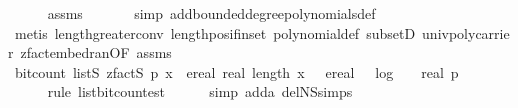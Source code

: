 \begin{isabellebody}
\ \ \ \ \isamarkupfalse%
\ assms{\isacharparenleft}{\kern0pt}{}{\isacharparenright}{\kern0pt}\ \isanewline
\ \ \ \ \isamarkupfalse%
\ {\isacharparenleft}{\kern0pt}simp\ add{\isacharcolon}{\kern0pt}bounded{\isacharunderscore}{\kern0pt}degree{\isacharunderscore}{\kern0pt}polynomials{\isacharunderscore}{\kern0pt}def{\isacharparenright}{\kern0pt}\isanewline
\ \ \ \ \isamarkupfalse%
\ {\isacharparenleft}{\kern0pt}metis\ length{\isacharunderscore}{\kern0pt}greater{\isacharunderscore}{\kern0pt}{}{\isacharunderscore}{\kern0pt}conv\ length{\isacharunderscore}{\kern0pt}pos{\isacharunderscore}{\kern0pt}if{\isacharunderscore}{\kern0pt}in{\isacharunderscore}{\kern0pt}set\ polynomial{\isacharunderscore}{\kern0pt}def\ subsetD\ univ{\isacharunderscore}{\kern0pt}poly{\isacharunderscore}{\kern0pt}carrier\ zfact{\isacharunderscore}{\kern0pt}embed{\isacharunderscore}{\kern0pt}ran{\isacharbrackleft}{\kern0pt}OF\ assms{\isacharparenleft}{\kern0pt}{}{\isacharparenright}{\kern0pt}{\isacharbrackright}{\kern0pt}{\isacharparenright}{\kern0pt}\isanewline
\isanewline
\ \ \isamarkupfalse%
\ {\isachardoublequoteopen}bit{\isacharunderscore}{\kern0pt}count\ {\isacharparenleft}{\kern0pt}list\isactrlsub S\ {\isacharparenleft}{\kern0pt}zfact\isactrlsub S\ p{\isacharparenright}{\kern0pt}\ x{\isacharparenright}{\kern0pt}\ {\isasymle}\ ereal\ {\isacharparenleft}{\kern0pt}real\ {\isacharparenleft}{\kern0pt}length\ x{\isacharparenright}{\kern0pt}{\isacharparenright}{\kern0pt}\ {\isacharasterisk}{\kern0pt}\ {\isacharparenleft}{\kern0pt}\ ereal\ {\isacharparenleft}{\kern0pt}{}\ {\isacharasterisk}{\kern0pt}\ log\ {}\ {\isacharparenleft}{\kern0pt}{}\ {\isacharplus}{\kern0pt}\ real\ {\isacharparenleft}{\kern0pt}p{\isacharminus}{\kern0pt}{}{\isacharparenright}{\kern0pt}{\isacharparenright}{\kern0pt}\ {\isacharplus}{\kern0pt}\ {}{\isacharparenright}{\kern0pt}\ {\isacharplus}{\kern0pt}\ {}{\isacharparenright}{\kern0pt}\ {\isacharplus}{\kern0pt}\ {}{\isachardoublequoteclose}\isanewline
\ \ \ \ \isamarkupfalse%
\ {\isacharparenleft}{\kern0pt}rule\ list{\isacharunderscore}{\kern0pt}bit{\isacharunderscore}{\kern0pt}count{\isacharunderscore}{\kern0pt}est{\isacharparenright}{\kern0pt}\isanewline
\ \ \ \ \isamarkupfalse%
\ {\isacharparenleft}{\kern0pt}simp\ add{\isacharcolon}{\kern0pt}a\ del{\isacharcolon}{\kern0pt}N\isactrlsub S{\isachardot}{\kern0pt}simps{\isacharparenright}{\kern0pt}\isanewline

\end{isabellebody}
